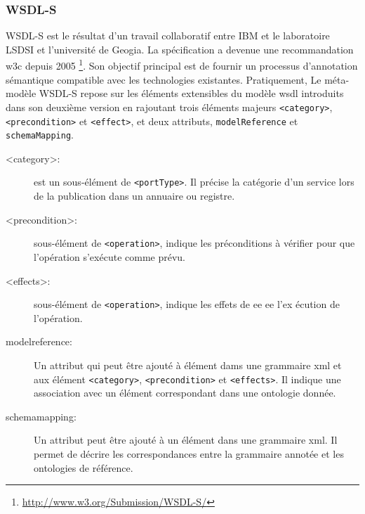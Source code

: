     \subsubsection{WSDL-S}
    \textsc{WSDL-S} \cite{akkiraju2005web} est le résultat d'un
    travail collaboratif entre IBM et le laboratoire LSDSI et
    l'université de Geogia. La spécification a devenue une
    recommandation \acrshort{w3c} depuis 2005
    \footnote{\url{http://www.w3.org/Submission/WSDL-S/}}. Son
    objectif principal est de fournir un processus d'annotation
    sémantique compatible avec les technologies
    existantes. Pratiquement, Le méta-modèle \textsc{WSDL-S} repose
    sur les éléments extensibles du modèle \acrshort{wsdl} introduits
    dans son deuxième version en rajoutant trois éléments majeurs
    \texttt{<category>}, \texttt{<precondition>} et \texttt{<effect>},
    et deux attributs, \texttt{modelReference} et
    \texttt{schemaMapping}.\medskip

    \renewcommand{\descriptionlabel}[1]{\hspace{0.5cm}\textbullet~\texttt{#1}}
    \begin{description}
    \item [<category>:] est un sous-élément de \texttt{<portType>}. Il
      précise la catégorie d'un service lors de la publication dans un
      annuaire ou registre.

    \item [<precondition>:] sous-élément de \texttt{<operation>},
      indique les préconditions à vérifier pour que l'opération
      s'exécute comme prévu.

    \item [<effects>:] sous-élément de \texttt{<operation>}, indique
      les effets de ee ee l'ex écution de l'opération.

    \item [modelreference:] Un attribut qui peut être ajouté à
      élément dams une grammaire \acrshort{xml} et aux élément
      \texttt{<category>}, \texttt{<precondition>} et
      \texttt{<effects>}. Il indique une association avec un élément
      correspondant dans une ontologie donnée.

    \item [schemamapping:] Un attribut peut être ajouté à un élément
      dans une grammaire \acrshort{xml}. Il permet de décrire les
      correspondances entre la grammaire annotée et les ontologies de
      référence.
    \end{description}
    \enddescription

